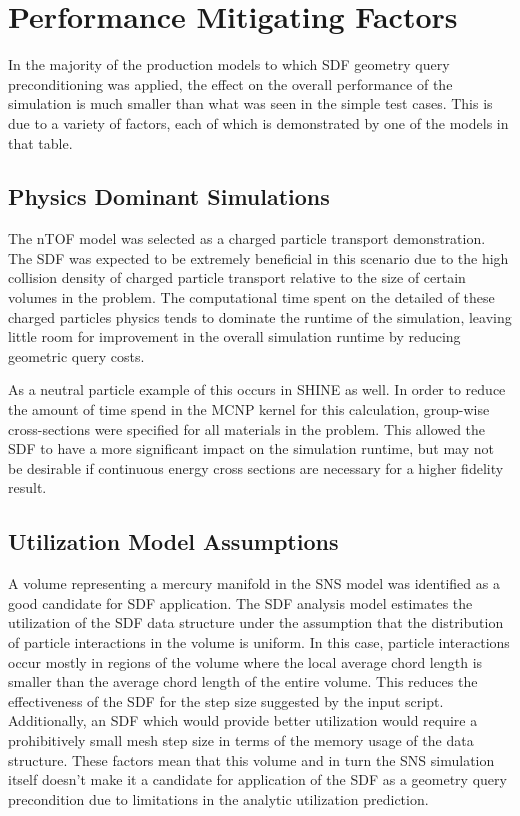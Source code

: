 \section{Performance Mitigating Factors}\label{sec:sdf_limitations}

In the majority of the production models to which SDF geometry query
preconditioning was applied, the effect on the overall performance of the
simulation is much smaller than what was seen in the simple test cases. This is
due to a variety of factors, each of which is demonstrated by one of the models
in that table.

\subsection{Physics Dominant Simulations}\label{subsec:sdf_phys_dominant}

The nTOF model was selected as a charged particle transport demonstration. The
SDF was expected to be extremely beneficial in this scenario due to the high
collision density of charged particle transport relative to the size of certain
volumes in the problem. The computational time spent on the detailed of these
charged particles physics tends to dominate the runtime of the simulation,
leaving little room for improvement in the overall simulation runtime by
reducing geometric query costs.

As a neutral particle example of this occurs in SHINE as well. In order to
reduce the amount of time spend in the MCNP kernel for this calculation,
group-wise cross-sections were specified for all materials in the problem. This
allowed the SDF to have a more significant impact on the simulation runtime, but
may not be desirable if continuous energy cross sections are necessary for a
higher fidelity result.

\subsection{Utilization Model Assumptions}\label{subsec:sdf_util_model_limits}

A volume representing a mercury manifold in the SNS model was identified as a
good candidate for SDF application. The SDF analysis model estimates the
utilization of the SDF data structure under the assumption that the distribution
of particle interactions in the volume is uniform. In this case, particle
interactions occur mostly in regions of the volume where the local average chord
length is smaller than the average chord length of the entire volume. This
reduces the effectiveness of the SDF for the step size suggested by the input
script. Additionally, an SDF which would provide better utilization would
require a prohibitively small mesh step size in terms of the memory usage of the
data structure. These factors mean that this volume and in turn the SNS
simulation itself doesn't make it a candidate for application of the SDF as a
geometry query precondition due to limitations in the analytic utilization prediction.

